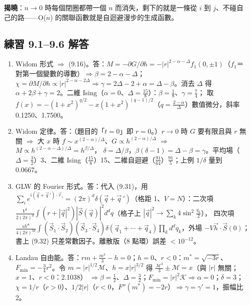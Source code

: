 \textbf{揭曉}：$n\to0$ 時每個閉圈都帶一個 $n$ 而消失，剩下的就是一條從 $i$ 到 $j$、不碰自己的路——O($n$) 的關聯函數就是自迴避漫步的生成函數。

\subsection{練習 9.1--9.6 解答}
{\small
\begin{enumerate}[label=\textbf{9.\arabic*},itemsep=0.05em]
\item Widom 形式 $\Rightarrow$ (9.16)。\quad 答：$M=-\partial G/\partial h=-|r|^{2-\alpha-\Delta}f_1(0,\pm1)$（$f_1$＝對第一個變數的導數）$\Rightarrow\beta=2-\alpha-\Delta$；
$\chi=\partial M/\partial h\propto|r|^{2-\alpha-2\Delta}\Rightarrow\gamma=2\Delta-2+\alpha=\Delta-\beta$。消去 $\Delta$ 得 $\alpha+2\beta+\gamma=2$。二維 Ising（$\alpha=0$、$\Delta=\frac{15}8$）：$\beta=\frac18$、$\gamma=\frac74$；
取 $f(x)=-(1+x^2)^{q/2}-x(1+x^2)^{(q-1)/2}$（$q=\frac{2-\alpha}\Delta$）數值微分，斜率 0.1250、1.7500。
\item Widom 定律。\quad 答：（題目的「$t=0$」即 $r=0$。）$r\to0$ 時 $G$ 要有限且與 $r$ 無關 $\Rightarrow$ 大 $x$ 時 $f\sim x^{(2-\alpha)/\Delta}$、$G\propto h^{(2-\alpha)/\Delta}$ $\Rightarrow$ $M\propto h^{(2-\alpha-\Delta)/\Delta}=h^{\beta/\Delta}$，
$\delta=\Delta/\beta$，$\beta(\delta-1)=\Delta-\beta=\gamma$。平均場（$\Delta=\frac32$）3、二維 Ising（$\frac{15}8$）15、二維自迴避（$\frac{91}{64}$）$\frac{91}5$；上例 $1/\delta$ 量到 0.0667。
\item GLW 的 Fourier 形式。\quad 答：代入 (9.31)，用 $\sum_ie^{i(\vec q+\vec q\,')\cdot\vec r_i}=(2\pi)^d\delta(\vec q+\vec q\,')$（格距 1、$V=N$）：二次項 $\frac{V^2}{2(2\pi)^d}\int(r+|\vec q|^2)|\vec S(\vec q)|^2d^dq$（格子上 $|\vec q|^2\to\sum_k4\sin^2\frac{q_k}2$），
四次項 $\frac{uV^4}{4(2\pi)^{3d}}\int(\vec S_1\cdot\vec S_2)(\vec S_3\cdot\vec S_4)\delta(\vec q_1+\cdots+\vec q_4)\prod_kd^dq_k$，外場 $-V\vec h\cdot\vec S(0)$；書上 (9.32) 只差常數因子。離散版（8 點環）誤差 $<10^{-12}$。
\item Landau 自由能。\quad 答：$rm+\frac{m^3}3-h=0$；$h=0$、$r<0$：$m^*=\sqrt{-3r}$、$F_{\min}=-\frac34r^2$。令 $m=|r|^{1/2}\mathcal M$、$h=x|r|^{3/2}$ 得 $\frac{\mathcal M^3}3\pm\mathcal M=x$（與 $|r|$ 無關；$x=1$、$r<0$：2.1038）
$\Rightarrow\beta=\frac12$、$\Delta=\frac32$；$F_{\min}=|r|^2\mathcal K\Rightarrow\alpha=0$；$\delta=3$；$\chi=1/r$（$r>0$）、$1/2|r|$（$r<0$，$F''(m^*)=-2r$）$\Rightarrow\gamma=\gamma'=1$，振幅比 2。

\end{enumerate}}
